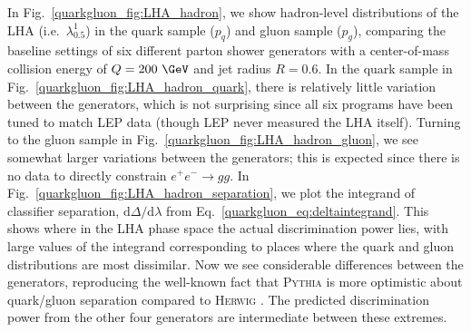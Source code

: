 \documentclass[11pt]{cernrep}
\begin{document}
In Fig.~\ref{quarkgluon_fig:LHA_hadron}, we show hadron-level distributions of the LHA (i.e.~$\lambda_{0.5}^1$) in the quark sample ($p_q$) and gluon sample ($p_g$), comparing the baseline settings of six different parton shower generators with a center-of-mass collision energy of $Q = 200~\GeV$ and jet radius $R = 0.6$. In the quark sample in Fig.~\ref{quarkgluon_fig:LHA_hadron_quark}, there is relatively little variation between the generators, which is not surprising since all six programs have been tuned to match LEP data (though LEP never measured the LHA itself).  Turning to the gluon sample in Fig.~\ref{quarkgluon_fig:LHA_hadron_gluon}, we see somewhat larger variations between the generators; this is expected since there is no data to directly constrain $e^+ e^- \to gg$.  In Fig.~\ref{quarkgluon_fig:LHA_hadron_separation}, we plot the integrand of classifier separation, $\text{d} \Delta / \text{d} \lambda$ from Eq.~\eqref{quarkgluon_eq:deltaintegrand}. This shows where in the LHA phase space the actual discrimination power lies, with large values of the integrand
corresponding to places where the quark and gluon distributions are
most dissimilar.  Now we see considerable differences between the
generators, reproducing the well-known fact that \textsc{Pythia} is
more optimistic about quark/gluon separation compared to
\textsc{Herwig} \cite{Aad:2014gea}.  The predicted discrimination power from the other four generators are intermediate between these
extremes.
\end{document}

